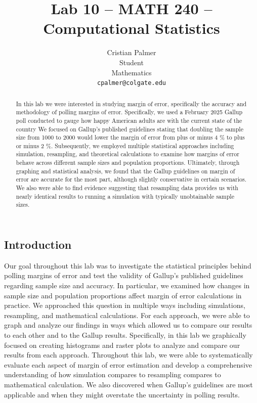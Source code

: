 \documentclass{article}\usepackage[]{graphicx}\usepackage[]{xcolor}
\begin{document}
\vspace{-1in}
\title{Lab 10 -- MATH 240 -- Computational Statistics}

\author{
  Cristian Palmer \\
  Student \\
  Mathematics  \\
  {\tt cpalmer@colgate.edu}
}

\date{}

\maketitle

\begin{multicols}{2}
\begin{abstract}
In this lab we were interested in studying margin of error, specifically the accuracy and methodology of polling margins of error. Specifically, we used a February 2025 Gallup poll conducted to gauge how happy American adults are with the current state of the country We focused on Gallup's published guidelines stating that doubling the sample size from 1000 to 2000 would lower the margin of error from plus or minus 4 \% to plus or minus 2 \%. Subsequently, we employed multiple statistical approaches including simulation, resampling, and theoretical calculations to examine how margins of error behave across different sample sizes and population proportions. Ultimately, through graphing and statistical analysis, we found that the Gallup guidelines on margin of error are accurate for the most part, although slightly conservative in certain scenarios. We also were able to find evidence suggesting that resampling data provides us with nearly identical results to running a simulation with typically unobtainable sample sizes.

\end{abstract}

\section{Introduction}
Our goal throughout this lab was to investigate the statistical principles behind polling margins of error and test the validity of Gallup's published guidelines regarding sample size and accuracy. In particular, we examined how changes in sample size and population proportions affect margin of error calculations in practice. We approached this question in multiple ways including simulations, resampling, and mathematical calculations. For each approach, we were able to graph and analyze our findings in ways which allowed us to compare our results to each other and to the Gallup results. Specifically, in this lab we graphically focused on creating histograms and raster plots to analyze and compare our results from each approach. Throughout this lab, we were able to systematically evaluate each aspect of margin of error estimation and develop a comprehensive understanding of how simulation compares to resampling compares to mathematical calculation. We also discovered when Gallup's guidelines are most applicable and when they might overstate the uncertainty in polling results. 


\end{multicols}
\end{document}
